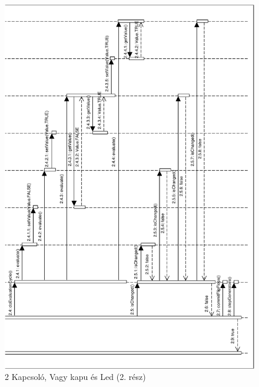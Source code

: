 \begin{figure}[H]
\begin{center}
\includegraphics[width=16cm]{chapters/chapter05/imgs/test3-2.pdf}
\caption{2 Kapcsoló, Vagy kapu és Led (2. rész)}
\label{fig:test3_2}
\end{center}
\end{figure}

